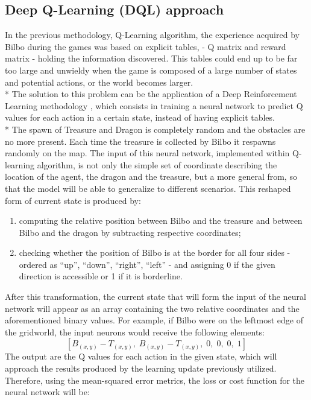 \subsection{Deep Q-Learning (DQL) approach}
In the previous methodology, Q-Learning algorithm, the experience acquired by Bilbo during the games was based on explicit tables, - Q matrix and reward matrix - holding the information discovered. This tables could end up to be far too large and unwieldy when the game is composed of a large number of states and potential actions, or the world becomes larger.\\*
The solution to this problem can be the application of a Deep Reinforcement Learning methodology \cite{3,6}, which consists in training a neural network to predict Q values for each action in a certain state, instead of having explicit tables.\\*
The spawn of Treasure and Dragon is completely random and the obstacles are no more present.
Each time the treasure is collected by Bilbo it respawns randomly on the map.
The input of this neural network, implemented within Q-learning algorithm, is not only the simple set of coordinate describing the location of the agent, the dragon and the treasure, but a more general from, so that the model will be able to generalize to different scenarios. This reshaped form of current state is produced by:
\begin{enumerate}[noitemsep, topsep=0ex]
  \item computing the relative position between Bilbo and the treasure and between Bilbo and the dragon by subtracting respective coordinates;
  \item checking whether the position of Bilbo is at the border for all four sides - ordered as ``up'', ``down'', ``right'', ``left'' - and assigning 0 if the given direction is accessible or 1 if it is borderline.
\end{enumerate}
After this transformation, the current state that will form the input of the neural network will appear as an array containing the two relative coordinates and the aforementioned binary values. For example, if Bilbo were on the leftmost edge of the gridworld, the input neurons would receive the following elements:
$$
[B_{(x,y)}-T_{(x,y)},\;B_{(x,y)}-T_{(x,y)},\;0,\;0,\;0,\;1]
$$
The output are the Q values for each action in the given state, which will approach the results produced by the learning update previously utilized. Therefore, using the mean-squared error metrics, the loss or cost function for the neural network will be:
